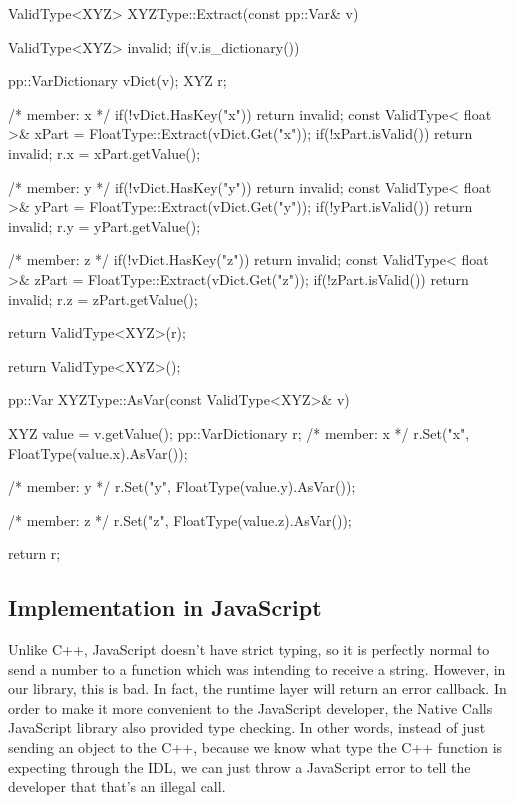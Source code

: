 \begin{code}
ValidType<XYZ> XYZType::Extract(const pp::Var& v){
  ValidType<XYZ> invalid;
  if(v.is_dictionary()){
    pp::VarDictionary vDict(v);
    XYZ r;

    /* member: x */
    if(!vDict.HasKey("x")) return invalid;
    const ValidType< float >& xPart = FloatType::Extract(vDict.Get("x"));
    if(!xPart.isValid()) return invalid;
    r.x = xPart.getValue();

    /* member: y */
    if(!vDict.HasKey("y")) return invalid;
    const ValidType< float >& yPart = FloatType::Extract(vDict.Get("y"));
    if(!yPart.isValid()) return invalid;
    r.y = yPart.getValue();

    /* member: z */
    if(!vDict.HasKey("z")) return invalid;
    const ValidType< float >& zPart = FloatType::Extract(vDict.Get("z"));
    if(!zPart.isValid()) return invalid;
    r.z = zPart.getValue();


    return ValidType<XYZ>(r);
  }
  return ValidType<XYZ>();
}

pp::Var XYZType::AsVar(const ValidType<XYZ>& v){
  XYZ value = v.getValue();
  pp::VarDictionary r;
  /* member: x */
  r.Set("x", FloatType(value.x).AsVar());

  /* member: y */
  r.Set("y", FloatType(value.y).AsVar());

  /* member: z */
  r.Set("z", FloatType(value.z).AsVar());

  return r;
}
\end{code}


\subsection{Implementation in JavaScript} %
\label{sub:webidl_implementation_in_javascript}
Unlike C++, JavaScript doesn't have strict typing, so it is perfectly normal to send a number to a function which was intending to receive a string. However, in our library, this is bad. In fact, the runtime layer will return an error callback. In order to make it more convenient to the JavaScript developer, the Native Calls JavaScript library also provided type checking. In other words, instead of just sending an object to the C++, because we know what type the C++ function is expecting through the IDL, we can just throw a JavaScript error to tell the developer that that's an illegal call.


